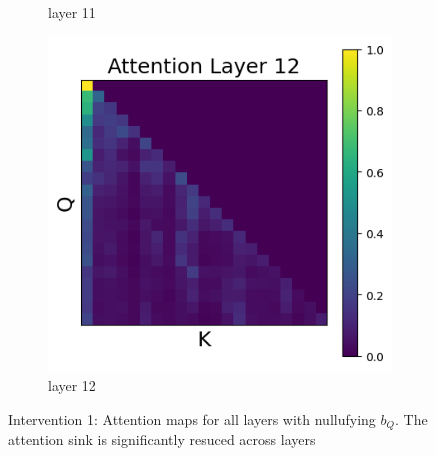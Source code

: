 \documentclass[11pt]{article}
\begin{document}
\begin{figure}[t]
\begin{subfigure}[t]{0.24\textwidth}
    \caption{layer 11}
  \end{subfigure}\hfill
  \begin{subfigure}[t]{0.24\textwidth}
    \centering
    \includegraphics[width=1.4\columnwidth]{figures/intervention1/layer_12.png}
    \caption{layer 12}
  \end{subfigure}\hfill

  \caption{Intervention 1: Attention maps for all layers with nullufying $b_Q$. The attention sink is significantly resuced across layers}
\end{figure}
\end{document}
